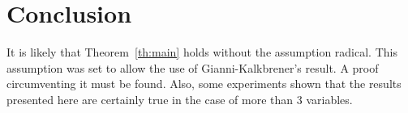 \documentclass[a4paper,11pt]{article}
\begin{document}
\section*{Conclusion}

It is likely that Theorem~\ref{th:main}
holds without the assumption  radical.
This assumption was set to allow the use
of Gianni-Kalkbrener's result. A proof
circumventing it must be found.
Also, some experiments shown  that the results presented
here are certainly true in the case of more than 3 variables.





\end{document}
